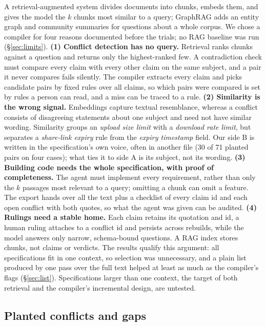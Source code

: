 \documentclass{article}
\begin{document}
A retrieval-augmented system \citep{lewis2020rag} divides documents into chunks,
embeds them, and gives the model the $k$ chunks most similar to a query; GraphRAG
\citep{edge2024graphrag} adds an entity graph and community summaries for questions about a whole corpus.
We chose a compiler for four reasons documented before the trials; no RAG baseline was run (\S\ref{sec:limits}).
\textbf{(1) Conflict detection has no query.} Retrieval ranks chunks against a question and returns only the highest-ranked few. A contradiction check must compare every claim with every other claim on the same subject, and
a pair it never compares fails silently. The compiler extracts every claim and picks candidate pairs by
fixed rules over all claims, so which pairs were compared is set by rules a person can read, and a miss
can be traced to a rule.
\textbf{(2) Similarity is the wrong signal.} Embeddings capture textual resemblance, whereas a conflict consists of disagreeing statements about one subject and need not have similar wording. Similarity groups an
\emph{upload size limit} with a \emph{download rate limit}, but separates a \emph{share-link expiry} rule
from the \emph{expiry timestamp} field. Our side B is written in the specification's own voice, often in
another file (30 of 71 planted pairs on four cases); what ties it to side A is its subject, not its
wording.
\textbf{(3) Building code needs the whole specification, with proof of completeness.} The agent must implement every requirement, rather than only the $k$ passages most relevant to a query; omitting a chunk can omit a feature. The export hands over all the text plus a checklist of every claim id and each open conflict
with both quotes, so what the agent was given can be audited.
\textbf{(4) Rulings need a stable home.} Each claim retains its quotation and id, a human ruling attaches to a conflict id and persists across rebuilds, while the model answers only narrow, schema-bound questions. A RAG
index stores chunks, not claims or verdicts.
The results qualify this argument: all specifications fit in one context, so selection was unnecessary, and a plain list produced by one pass over the full text helped at least as much as the compiler's flags (\S\ref{sec:list}). Specifications larger than one context, the target of both retrieval and the
compiler's incremental design, are untested.

\subsection{Planted conflicts and gaps}\label{sec:planted}
\end{document}
